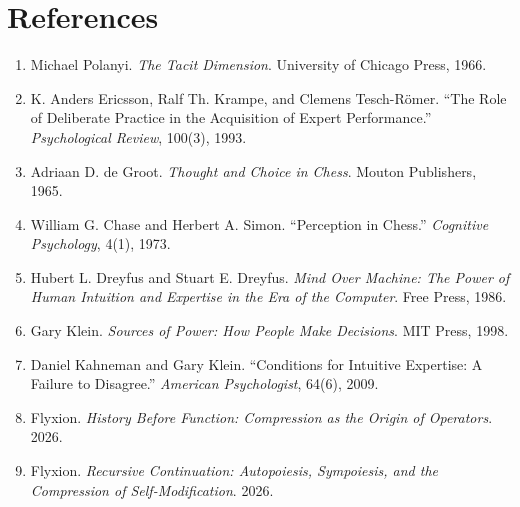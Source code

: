 \documentclass[11pt]{article}
\begin{document}
\section*{References}

\begin{enumerate}
\item Michael Polanyi. \emph{The Tacit Dimension}. University of Chicago Press, 1966.
\item K. Anders Ericsson, Ralf Th. Krampe, and Clemens Tesch-R\"omer. ``The Role of Deliberate Practice in the Acquisition of Expert Performance.'' \emph{Psychological Review}, 100(3), 1993.
\item Adriaan D. de Groot. \emph{Thought and Choice in Chess}. Mouton Publishers, 1965.
\item William G. Chase and Herbert A. Simon. ``Perception in Chess.'' \emph{Cognitive Psychology}, 4(1), 1973.
\item Hubert L. Dreyfus and Stuart E. Dreyfus. \emph{Mind Over Machine: The Power of Human Intuition and Expertise in the Era of the Computer}. Free Press, 1986.
\item Gary Klein. \emph{Sources of Power: How People Make Decisions}. MIT Press, 1998.
\item Daniel Kahneman and Gary Klein. ``Conditions for Intuitive Expertise: A Failure to Disagree.'' \emph{American Psychologist}, 64(6), 2009.
\item Flyxion. \emph{History Before Function: Compression as the Origin of Operators}. 2026.
\item Flyxion. \emph{Recursive Continuation: Autopoiesis, Sympoiesis, and the Compression of Self-Modification}. 2026.
\end{enumerate}
\end{document}
